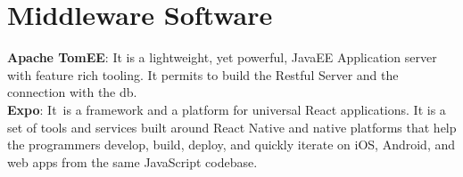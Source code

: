\section{Middleware Software}
 
 \textbf{Apache TomEE}:  It is a lightweight, yet powerful, JavaEE Application server with feature rich tooling.  It permits to build the Restful Server and the connection with the db.\\
 \textbf{Expo}: It is a framework and a platform for universal React applications. It is a set of tools and services built around React Native and native platforms that help the programmers develop, build, deploy, and quickly iterate on iOS, Android, and web apps from the same JavaScript codebase.